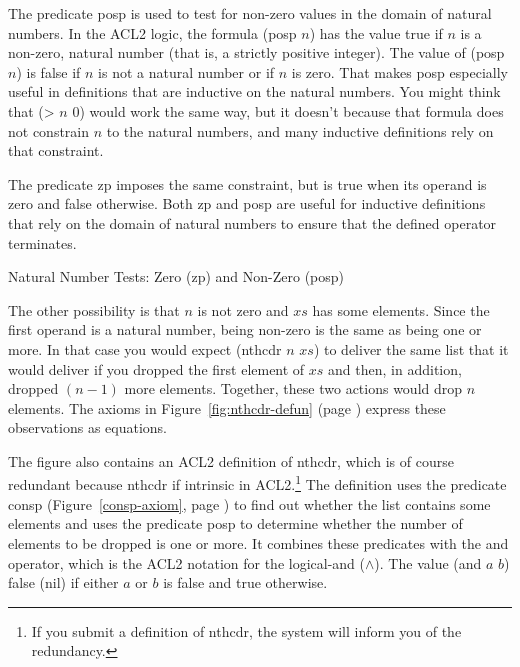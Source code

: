 \begin{aside}
The predicate \textsf{posp} is used to test for non-zero values
in the domain of natural numbers.
In the ACL2 logic, the formula \textsf{(posp $n$)} has the value true if $n$ is
a non-zero, natural number (that is, a strictly positive integer).
The value of \textsf{(posp $n$)} is false if $n$ is not a natural number
or if $n$ is zero.
That makes \textsf{posp} especially useful
in definitions that are inductive on the natural numbers.
You might think that \textsf{(> $n$ 0)} would
work the same way, but it doesn't because that formula
does not constrain $n$ to the natural numbers,
and many inductive definitions rely on that constraint.

The predicate \textsf{zp} imposes the same constraint,
but is true when its operand is zero and false otherwise.
Both \textsf{zp} and \textsf{posp} are useful for inductive definitions that
rely on the domain of natural numbers to ensure that the
defined operator terminates.
\caption{Natural Number Tests: Zero (\textsf{zp}) and Non-Zero (\textsf{posp})}
\label{zp-def}
\end{aside}

The other possibility is that $n$ is not zero and $xs$ has some elements.
Since the first operand is a natural number,
being non-zero is the same as being one or more.
In that case you would expect \textsf{(nthcdr $n$ $xs$)} to deliver
the same list that it would deliver
if you dropped the first element of $xs$
and then, in addition, dropped $(n - 1)$ more elements.
Together, these two actions would drop $n$ elements.
The axioms in Figure~\ref{fig:nthcdr-defun} (page \pageref{fig:nthcdr-defun})
express these observations as equations.

The figure also contains an ACL2 definition of \textsf{nthcdr}, which
is of course redundant because \textsf{nthcdr} if intrinsic in ACL2.\footnote{If
you submit a definition of \textsf{nthcdr},
the system will inform you of the redundancy.}
The definition uses the predicate \textsf{consp}
(Figure~\ref{consp-axiom}, page \pageref{consp-axiom})
to find out whether the list contains some elements and
uses the predicate
\label{posp-def} \textsf{posp}
to determine whether
the number of elements to be dropped is one or more.
It combines these predicates with the \textsf{and} operator,
which is the ACL2 notation for the logical-and ($\wedge$).
\label{and-op=informal}
The value \textsf{(and $a$ $b$)} false (nil)
if either $a$ or $b$ is false and true otherwise.


